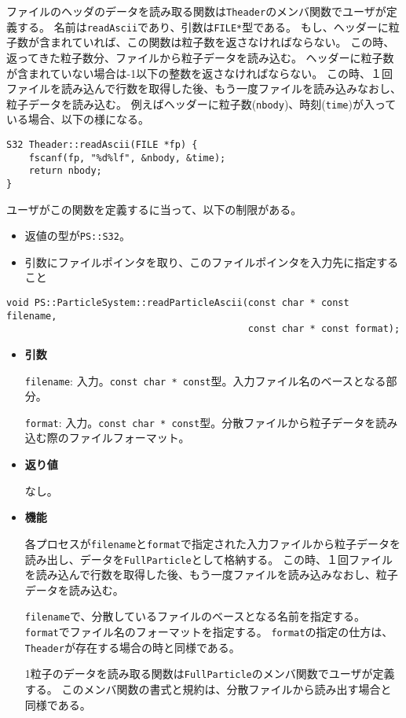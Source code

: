 \begin{itemize}
ファイルのヘッダのデータを読み取る関数は{\tt Theader}のメンバ関数でユーザが定義する。
名前は{\tt readAscii}であり、引数は{\tt FILE*}型である。
もし、ヘッダーに粒子数が含まれていれば、この関数は粒子数を返さなければならない。
この時、返ってきた粒子数分、ファイルから粒子データを読み込む。
ヘッダーに粒子数が含まれていない場合は-1以下の整数を返さなければならない。
この時、１回ファイルを読み込んで行数を取得した後、もう一度ファイルを読み込みなおし、粒子データを読み込む。
例えばヘッダーに粒子数(\verb|nbody|)、時刻(\verb|time|)が入っている場合、以下の様になる。

\begin{verbatim}
S32 Theader::readAscii(FILE *fp) {
    fscanf(fp, "%d%lf", &nbody, &time);
    return nbody;
}
\end{verbatim}

ユーザがこの関数を定義するに当って、以下の制限がある。
\begin{itemize}
\item 返値の型が\verb|PS::S32|。
\item 引数にファイルポインタを取り、このファイルポインタを入力先に指定すること
\end{itemize}

\end{itemize}


\begin{screen}
\begin{verbatim}
void PS::ParticleSystem::readParticleAscii(const char * const filename,
                                           const char * const format);
\end{verbatim}
\end{screen}

\begin{itemize}

\item{{\bf 引数}}

{\tt filename}: 入力。{\tt const char * const}型。入力ファイル名のベースとなる部分。

{\tt format}: 入力。{\tt const char * const}型。分散ファイルから粒子データを読み込む際のファイルフォーマット。

\item{{\bf 返り値}}

なし。

\item{{\bf 機能}}

各プロセスが{\tt filename}と{\tt format}で指定された入力ファイルから粒子データを読み出し、データを{\tt FullParticle}として格納する。
この時、１回ファイルを読み込んで行数を取得した後、もう一度ファイルを読み込みなおし、粒子データを読み込む。

{\tt filename}で、分散しているファイルのベースとなる名前を指定する。
{\tt format}でファイル名のフォーマットを指定する。
{\tt format}の指定の仕方は、{\tt Theader}が存在する場合の時と同様である。

1粒子のデータを読み取る関数は{\tt FullParticle}のメンバ関数でユーザが定義する。
このメンバ関数の書式と規約は、分散ファイルから読み出す場合と同様である。

\end{itemize}

